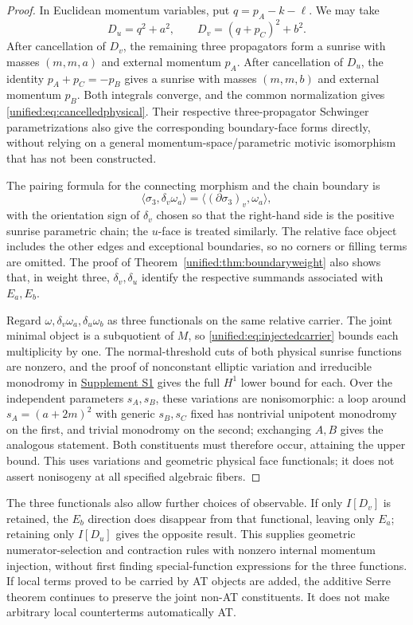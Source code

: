 \documentclass[11pt,a4paper,oneside]{article}
\theoremstyle{plain}
\theoremstyle{definition}
\theoremstyle{remark}
\numberwithin{equation}{section}
\newcommand{\otherref}[2]{\href{#1.pdf}{#2}}
\begin{document}
\begin{proof}
In Euclidean momentum variables, put $q=p_A-k-\ell$. We may take
\[
 D_u=q^2+a^2,\qquad D_v=(q+p_C)^2+b^2.
\]
After cancellation of $D_v$, the remaining three propagators form a sunrise with masses $(m,m,a)$ and external momentum $p_A$.
After cancellation of $D_u$, the identity $p_A+p_C=-p_B$ gives a sunrise with masses $(m,m,b)$
and external momentum $p_B$. Both integrals converge, and the common normalization gives \eqref{unified:eq:cancelledphysical}.
Their respective three-propagator Schwinger parametrizations also give the corresponding boundary-face forms directly,
without relying on a general momentum-space/parametric motivic isomorphism that has not been constructed.

The pairing formula for the connecting morphism and the chain boundary is
\[
 \langle\sigma_3,\delta_v\omega_a\rangle
   =\langle(\partial\sigma_3)_v,\omega_a\rangle,
\]
with the orientation sign of $\delta_v$ chosen so that the right-hand side is the positive sunrise parametric chain; the $u$-face is treated similarly.
The relative face object includes the other edges and exceptional boundaries, so no corners or filling terms are omitted.
The proof of Theorem~\ref{unified:thm:boundaryweight} also shows that, in weight three, $\delta_v,\delta_u$
identify the respective summands associated with $E_a,E_b$.

Regard $\omega,\delta_v\omega_a,\delta_u\omega_b$ as three functionals on the same relative carrier.
The joint minimal object is a subquotient of $M$, so \eqref{unified:eq:injectedcarrier} bounds each multiplicity by one.
The normal-threshold cuts of both physical sunrise functions are nonzero,
and the proof of nonconstant elliptic variation and irreducible monodromy in \otherref{feynman_periods_supplement_en}{Supplement S1} gives the full $H^1$ lower bound for each.
Over the independent parameters $s_A,s_B$, these variations are nonisomorphic:
a loop around $s_A=(a+2m)^2$ with generic $s_B,s_C$ fixed has nontrivial unipotent monodromy on the first,
and trivial monodromy on the second; exchanging $A,B$ gives the analogous statement. Both constituents must therefore occur, attaining the upper bound.
This uses variations and geometric physical face functionals; it does not assert nonisogeny at all specified algebraic fibers.
\end{proof}

The three functionals also allow further choices of observable.
If only $I[D_v]$ is retained, the $E_b$ direction does disappear from that functional, leaving only $E_a$;
retaining only $I[D_u]$ gives the opposite result. This supplies geometric numerator-selection and contraction rules with nonzero internal momentum injection,
without first finding special-function expressions for the three functions.
If local terms proved to be carried by AT objects are added, the additive Serre theorem continues to preserve the joint non-AT constituents.
It does not make arbitrary local counterterms automatically AT.
\end{document}
